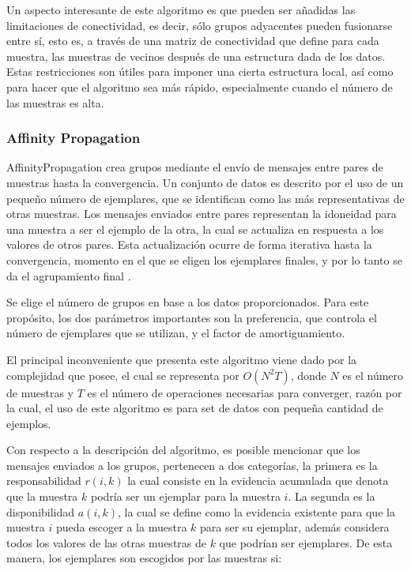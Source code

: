 Un aspecto interesante de este algoritmo es que pueden ser añadidas las limitaciones de conectividad, es decir, sólo grupos adyacentes pueden fusionarse entre sí, esto es, a través de una matriz de conectividad que define para cada muestra, las muestras de vecinos después de una estructura dada de los datos. Estas restricciones son útiles para imponer una cierta estructura local, así como para hacer que el algoritmo sea más rápido, especialmente cuando el número de las muestras es alta.

\subsubsection{Affinity Propagation}

AffinityPropagation crea grupos mediante el envío de mensajes entre pares de muestras hasta la convergencia. Un conjunto de datos es descrito por el uso de un pequeño número de ejemplares, que se identifican como las más representativas de otras muestras. Los mensajes enviados entre pares representan la idoneidad para una muestra a ser el ejemplo de la otra, la cual se actualiza en respuesta a los valores de otros pares. Esta actualización ocurre de forma iterativa hasta la convergencia, momento en el que se eligen los ejemplares finales, y por lo tanto se da el agrupamiento final \cite{frey2007clustering}.

Se elige el número de grupos en base a los datos proporcionados. Para este propósito, los dos parámetros importantes son la preferencia, que controla el número de ejemplares que se utilizan, y el factor de amortiguamiento.

El principal inconveniente que presenta este algoritmo viene dado por la complejidad que posee, el cual se representa por $O(N^{2}T)$, donde $N$ es el número de muestras y $T$ es el número de operaciones necesarias para converger, razón por la cual, el uso de este algoritmo es para set de datos con pequeña cantidad de ejemplos.

Con respecto a la descripción del algoritmo, es posible mencionar que los mensajes enviados a los grupos, pertenecen a dos categorías, la primera es la responsabilidad $r(i,k)$ la cual consiste en la evidencia acumulada que denota que la muestra $k$ podría ser un ejemplar para la muestra $i$. La segunda es la disponibilidad $a(i,k)$, la cual se define como la evidencia existente para que la muestra $i$ pueda escoger a la muestra $k$ para ser su ejemplar, además considera todos los valores de las otras muestras de $k$ que podrían ser ejemplares. De esta manera, los ejemplares son escogidos por las muestras si:


